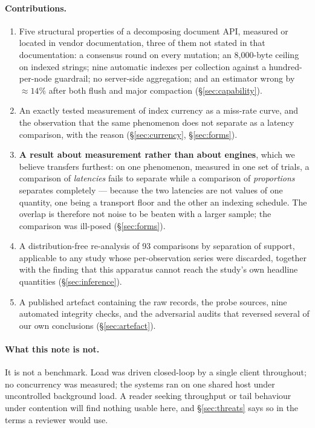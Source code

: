 \documentclass[11pt,a4paper]{article}
\begin{document}
\paragraph{Contributions.}
\begin{enumerate}
\item Five structural properties of a decomposing document API, measured or located in vendor
documentation, three of them not stated in that documentation: a consensus round on every mutation;
an 8{,}000-byte ceiling on indexed strings; nine automatic indexes per collection against a
hundred-per-node guardrail; no server-side aggregation; and an estimator wrong by $\approx 14\%$
after both flush and major compaction (\S\ref{sec:capability}).
\item An exactly tested measurement of index currency as a miss-rate curve, and the observation
that the same phenomenon does not separate as a latency comparison, with the reason
(\S\ref{sec:currency}, \S\ref{sec:forms}).
\item \textbf{A result about measurement rather than about engines}, which we believe transfers
furthest: on one phenomenon, measured in one set of trials, a comparison of \emph{latencies} fails to
separate while a comparison of \emph{proportions} separates completely --- because the two latencies
are not values of one quantity, one being a transport floor and the other an indexing schedule. The
overlap is therefore not noise to be beaten with a larger sample; the comparison was ill-posed
(\S\ref{sec:forms}).

\item A distribution-free re-analysis of 93 comparisons by separation of support, applicable to any
study whose per-observation series were discarded, together with the finding that this apparatus
cannot reach the study's own headline quantities (\S\ref{sec:inference}).
\item A published artefact containing the raw records, the probe sources, nine automated integrity
checks, and the adversarial audits that reversed several of our own conclusions
(\S\ref{sec:artefact}).
\end{enumerate}

\paragraph{What this note is not.} It is not a benchmark. Load was driven closed-loop by a single
client throughout; no concurrency was measured; the systems ran on one shared host under
uncontrolled background load. A reader seeking throughput or tail behaviour under contention will
find nothing usable here, and \S\ref{sec:threats} says so in the terms a reviewer would use.
\end{document}
